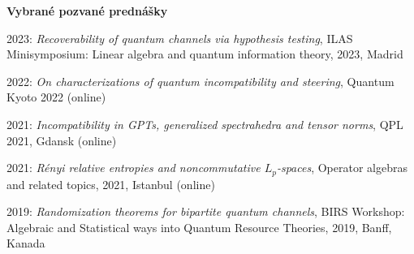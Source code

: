 \documentclass[12pt]{article}
\begin{document}
\noindent
\textbf{Vybrané pozvané prednášky}

\begin{description}[noitemsep,leftmargin=1.3cm, font=\normalfont]
\item{2023:} \emph{Recoverability of quantum channels via hypothesis testing}, ILAS
Minisymposium: Linear algebra and quantum information theory,  2023, Madrid

\item{2022:} \emph{ On characterizations of quantum incompatibility and steering}, Quantum Kyoto 2022 (online)

\item{2021:} \emph{Incompatibility in GPTs, generalized spectrahedra and tensor norms},
QPL 2021, Gdansk (online)

\item{2021:} \emph{ Rényi relative entropies and noncommutative $L_p$-spaces}, Operator
algebras and related topics, 2021, Istanbul (online)

\item{2019:} \emph{Randomization theorems for bipartite quantum channels}, BIRS Workshop: Algebraic and Statistical ways into Quantum Resource Theories, 2019, Banff, Kanada


\end{description}
\end{document}
